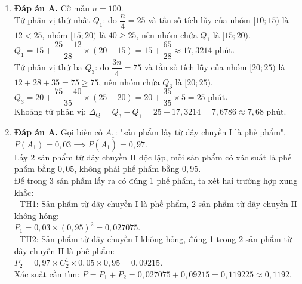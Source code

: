 \documentclass[12pt,a4paper]{article}
\begin{document}
\begin{enumerate}[label=\textbf{Câu \arabic*:}, leftmargin=*]
\item \textbf{Đáp án A.} Cỡ mẫu $n = 100$.\\
Tứ phân vị thứ nhất $Q_1$: do $\dfrac{n}{4} = 25$ và tần số tích lũy của nhóm $[10; 15)$ là $12 < 25$, nhóm $[15; 20)$ là $40 \ge 25$, nên nhóm chứa $Q_1$ là $[15; 20)$.\\
$Q_1 = 15 + \dfrac{25 - 12}{28} \times (20 - 15) = 15 + \dfrac{65}{28} \approx 17{,}3214\text{ phút}$.\\
Tứ phân vị thứ ba $Q_3$: do $\dfrac{3n}{4} = 75$ và tần số tích lũy của nhóm $[20; 25)$ là $12 + 28 + 35 = 75 \ge 75$, nên nhóm chứa $Q_3$ là $[20; 25)$.\\
$Q_3 = 20 + \dfrac{75 - 40}{35} \times (25 - 20) = 20 + \dfrac{35}{35} \times 5 = 25\text{ phút}$.\\
Khoảng tứ phân vị: $\Delta_Q = Q_3 - Q_1 = 25 - 17{,}3214 = 7{,}6786 \approx 7{,}68\text{ phút}$.

\item \textbf{Đáp án A.} Gọi biến cố $A_1$: "sản phẩm lấy từ dây chuyền I là phế phẩm", $P(A_1) = 0{,}03 \implies P(\overline{A_1}) = 0{,}97$.\\
Lấy 2 sản phẩm từ dây chuyền II độc lập, mỗi sản phẩm có xác suất là phế phẩm bằng $0{,}05$, không phải phế phẩm bằng $0{,}95$.\\
Để trong 3 sản phẩm lấy ra có đúng 1 phế phẩm, ta xét hai trường hợp xung khắc:\\
- TH1: Sản phẩm từ dây chuyền I là phế phẩm, 2 sản phẩm từ dây chuyền II không hỏng:\\
$P_1 = 0{,}03 \times (0{,}95)^2 = 0{,}027075$.\\
- TH2: Sản phẩm từ dây chuyền I không hỏng, đúng 1 trong 2 sản phẩm từ dây chuyền II là phế phẩm:\\
$P_2 = 0{,}97 \times C_2^1 \times 0{,}05 \times 0{,}95 = 0{,}09215$.\\
Xác suất cần tìm: $P = P_1 + P_2 = 0{,}027075 + 0{,}09215 = 0{,}119225 \approx 0{,}1192$.


\end{enumerate}
\end{document}
